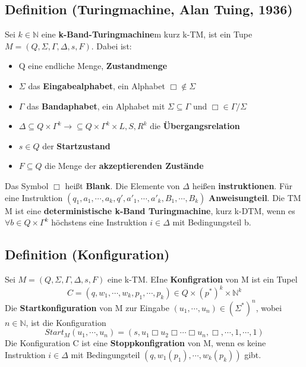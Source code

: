 \documentclass[a4paper,11pt]{article}
\begin{document}
\subsection{Definition (Turingmachine, Alan Tuing, 1936)} Sei $k \in \mathbb{N}$ eine \textbf{k-Band-Turingmachine}m kurz k-TM, ist ein Tupe $M = (Q, \Sigma, \varGamma, \Delta, s, F )$. Dabei ist:
\begin{itemize}
  \item Q eine endliche Menge, \textbf{Zustandmenge}
  \item $\Sigma$ das \textbf{Eingabealphabet}, ein Alphabet $\Box \not \in \Sigma$
  \item $\varGamma$ das \textbf{Bandaphabet}, ein Alphabet mit $\Sigma \subseteq \varGamma$ und $\Box \in \varGamma / \Sigma$ 
  \item $\Delta \subseteq Q \times \varGamma^{k} \rightarrow \subseteq Q \times \varGamma^{k} \times {L, S, R}^{k}$ die \textbf{Übergangsrelation}
  \item $s \in Q$ der \textbf{Startzustand}
  \item $F \subseteq Q$ die Menge der \textbf{akzeptierenden Zustände} 
\end{itemize}
\begin{sloppypar}
  \noindent Das Symbol $\Box$ heißt \textbf{Blank}. Die Elemente von $\Delta$ heißen \textbf{instruktionen}. Für eine Instruktion $(q_{1}, a_{1}, \cdots, a_{k}, q', a'_{1}, \cdots, a'_{k}, B_{1}, \cdots, B_{k})$ \textbf{Anweisungteil}. Die TM M ist eine \textbf{deterministische k-Band Turingmachine}, kurz k-DTM, wenn es $\forall b \in Q \times \varGamma^{k}$ höchstens eine Instruktion $i \in \Delta$ mit Bedingungsteil b.
\end{sloppypar}

\subsection{Definition (Konfiguration)} Sei $M = (Q, \Sigma, \Gamma, \Delta, s, F)$ eine k-TM. EIne \textbf{Konfigration} von M ist ein Tupel \[C = (q, w_{1}, \cdots, w_{k}, p_{1}, \cdots, p_{k}) \in Q \times (p^{*})^{k} \times \mathbb{N}^{k}\] Die \textbf{Startkonfiguration} von M zur Eingabe $(u_{1}, \cdots, u_{n}) \in (\Sigma^{*})^{n}$, wobei $n \in \mathbb{N}$, ist die Konfiguration \[Start_{M}(u_{1}, \cdots, u_{n}) = (s, u_{1} \Box u_{2} \Box \cdots \Box u_{n}, \Box, \cdots, 1, \cdots, 1)\] Die Konfiguration C ist eine \textbf{Stoppkonfigration} von M, wenn es keine Instruktion $i \in \Delta$ mit Bedingungsteil $(q, w_{1}(p_{1}), \cdots, w_{k}(p_{k}))$ gibt.
\end{document}
